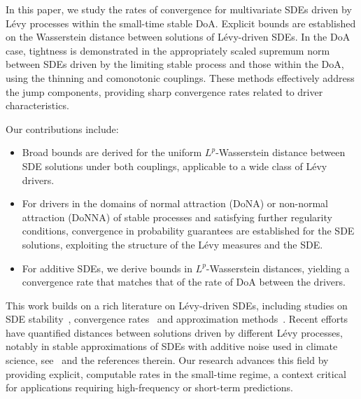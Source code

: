 \documentclass[en,oneside,bbfont,article]{amsart}
\theoremstyle{remark}
\theoremstyle{definition}
\theoremstyle{definition}
\newcommand\1{\mathds{1}}
\begin{document}
In this paper, we study the rates of convergence for multivariate SDEs driven by L\'evy processes within the small-time stable DoA. Explicit bounds are established on the Wasserstein distance between solutions of Lévy-driven SDEs. In the DoA case, tightness is demonstrated in the appropriately scaled supremum norm between SDEs driven by the limiting stable process and those within the DoA, using the thinning and comonotonic couplings. These methods effectively address the jump components, providing sharp convergence rates related to driver characteristics.

Our contributions include:
\begin{itemize}
\item Broad bounds are derived for the uniform $L^p$-Wasserstein distance between SDE solutions under both couplings, applicable to a wide class of Lévy drivers.
\item For drivers in the domains of normal attraction (DoNA) or non-normal attraction (DoNNA) of stable processes and satisfying further regularity conditions, convergence in probability guarantees are established for the SDE solutions, exploiting the structure of the L\'evy measures and the SDE.
\item For additive SDEs, we derive bounds in $L^p$-Wasserstein distances, yielding a convergence rate that matches that of the rate of DoA between the drivers.
\end{itemize}

This work builds on a rich literature on L\'evy-driven SDEs, including studies on SDE stability~\cite{MR2001996,MR2160585}, convergence rates~\cite{MR3332269} and approximation methods~\cite{pavlyukevich2025stronguniformwongzakaiapproximations,kosenkova2020orderconvergenceweakwongzakai,MR2802466,MR2759203}. Recent efforts have quantified distances between solutions driven by different L\'evy processes, notably in stable approximations of SDEs with additive noise used in climate science, see~\cite{MR3332269} and the references therein. Our research advances this field by providing explicit, computable rates in the small-time regime, a context critical for applications requiring high-frequency or short-term predictions. 
 
\end{document}
